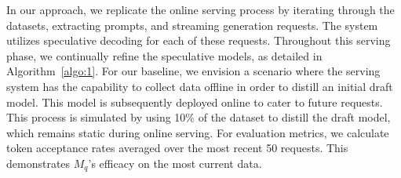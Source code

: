 In our approach, we replicate the online serving process by iterating through the datasets, extracting prompts, and streaming generation requests. The system utilizes speculative decoding for each of these requests. Throughout this serving phase, we continually refine the speculative models, as detailed in Algorithm~\ref{algo:1}.
For our baseline, we envision a scenario where the serving system has the capability to collect data offline in order to distill an initial draft model. This model is subsequently deployed online to cater to future requests. This process is simulated by using 10\% of the dataset to distill the draft model, which remains static during online serving.
For evaluation metrics, we calculate token acceptance rates averaged over the most recent 50 requests. This demonstrates $M_q$'s efficacy on the most current data.

